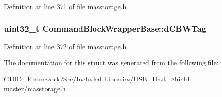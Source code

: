 \-Definition at line 371 of file masstorage.\-h.

\hypertarget{struct_command_block_wrapper_base_a0898a332eec2d598b80a896ff66d5549}{
\subsubsection[{d\-C\-B\-W\-Tag}]{\setlength{\rightskip}{0pt plus 5cm}uint32\-\_\-t {\bf \-Command\-Block\-Wrapper\-Base\-::d\-C\-B\-W\-Tag}}}\label{struct_command_block_wrapper_base_a0898a332eec2d598b80a896ff66d5549}


\-Definition at line 372 of file masstorage.\-h.



\-The documentation for this struct was generated from the following file\-:\begin{DoxyCompactItemize}
\item 
\-G\-H\-I\-D\-\_\-\-Framework/\-Src/\-Included Libraries/\-U\-S\-B\-\_\-\-Host\-\_\-\-Shield\-\_.-\/master/\hyperlink{masstorage_8h}{masstorage.\-h}\end{DoxyCompactItemize}
